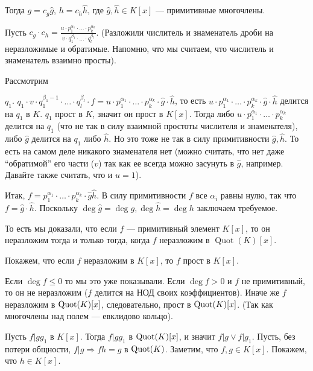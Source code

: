 \begin{solution}
Тогда \(g = c_g \hat{g}\), \(h = c_h \hat{h}\), где \(\hat{g}, \hat{h} \in K[x]\) --- примитивные многочлены.

Пусть \(c_g \cdot c_h = \frac{u \cdot p_1^{\alpha_1} \cdot \ldots \cdot p_k^{\alpha_k}} {v \cdot q_1^{\beta_1} \cdot \ldots \cdot q_l^{\beta_l}}\). (Разложили числитель и знаменатель дроби на неразложимые и обратимые. Напомню, что мы считаем, что числитель и знаменатель взаимно просты).

\hypertarget{9.3.no.denominator}{Рассмотрим} \(q_1\).
\(q_1 \cdot v \cdot q_1^{\beta_1 - 1} \cdot \ldots \cdot q_l^{\beta_l} \cdot f = u \cdot p_1^{\alpha_1} \cdot \ldots \cdot p_k^{\alpha_k} \cdot \hat{g} \cdot \hat{h}\), то есть
\(u \cdot p_1^{\alpha_1} \cdot \ldots \cdot p_k^{\alpha_k} \cdot \hat{g} \cdot \hat{h}\) делится на \(q_1\) в \(K\). \(q_1\) прост в \(K\), значит он прост в \(K[x]\). Тогда либо
\(u \cdot p_1^{\alpha_1} \cdot \ldots \cdot p_k^{\alpha_k}\) делится на \(q_1\) (что не так в силу взаимной простоты числителя и знаменателя), либо
\(\hat{g}\) делится на \(q_1\) либо \(\hat{h}\). Но это тоже не так в силу примитивности \(\hat{g}, \hat{h}\). То есть на самом деле никакого знаменателя нет (можно считать, что нет даже ``обратимой'' его части (\(v\)) так как ее всегда можно засунуть в \(\hat{g}\), например. Давайте также считать, что и \(u = 1\)).

Итак, \(f = p_1^{\alpha_1} \cdot \ldots \cdot p_k^{\alpha_k} \cdot \hat{g} \hat{h}\). В силу примитивности \(f\) все \(\alpha_i\) равны нулю, так что \(f = \hat{g} \cdot \hat{h}\). Поскольку \(\deg \hat{g} = \deg g, \deg \hat{h} = \deg h\) заключаем требуемое.

То есть мы доказали, что если \(f\) --- примитивный элемент \(K[x]\), то он неразложим тогда и только тогда, когда \(f\) неразложим в \(\operatorname{Quot}(K)[x]\).

Покажем, что если \(f\) неразложим в \(K[x]\), то \(f\) прост в \(K[x]\).

Если \(\deg f \leqslant 0\) то мы это уже показывали. Если \(\deg f > 0\) и \(f\) не примитивный, то он не неразложим (\(f\) делится на НОД своих коэффициентов). Иначе же \(f\) неразложим в \(\operatorname{Quot}(K)[x]\), следовательно, прост в \(\operatorname{Quot}(K)[x]\). (Так как многочлены над полем --- евклидово кольцо).

Пусть \(f | gg_1\) в \(K[x]\). Тогда \(f | gg_1\) в \(\operatorname{Quot}(K)[x]\), и значит \(f | g \lor f | g_1\). Пусть, без потери общности, \(f | g \Rightarrow fh = g\) в \(\operatorname{Quot}(K)\). Заметим, что \(f, g \in K[x]\). Покажем, что \(h \in K[x]\).


\end{solution}
